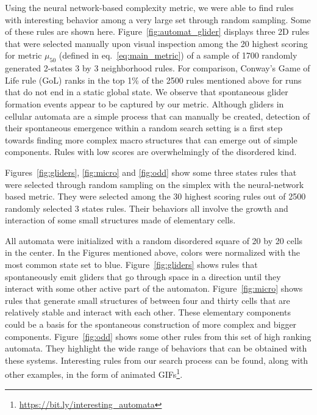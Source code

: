 Using the neural network-based complexity metric, we were able to find rules
with interesting behavior among a very large set through random sampling. Some
of these rules are shown here. Figure~\ref{fig:automat_glider} displays three 2D
rules that were selected manually upon visual inspection among the 20 highest
scoring for metric $\mu_{50}$ (defined in eq.~\eqref{eq:main_metric}) of a sample
of 1700 randomly generated 2-states 3 by 3 neighborhood rules. For comparison,
Conway's Game of Life rule (GoL) ranks in the top 1\% of the 2500 rules
mentioned above for runs that do not end in a static global state. We observe
that spontaneous glider formation events appear to be captured by our metric.
Although gliders in cellular automata are a simple process that can manually be
created, detection of their spontaneous emergence within a random search setting
is a first step towards finding more complex macro structures that can emerge
out of simple components. Rules with low scores are overwhelmingly of the
disordered kind.

Figures~\ref{fig:gliders}, \ref{fig:micro} and \ref{fig:odd} show some three
states rules that were selected through random sampling on the simplex with the
neural-network based metric. They were selected among the 30 highest scoring
rules out of 2500 randomly selected 3 states rules. Their behaviors all involve
the growth and interaction of some small structures made of elementary cells.

All automata were initialized with a random disordered square of 20 by 20 cells
in the center. In the Figures mentioned above, colors were normalized with the
most common state set to blue. Figure~\ref{fig:gliders} shows rules that
spontaneously emit gliders that go through space in a direction until they
interact with some other active part of the automaton. Figure~\ref{fig:micro}
shows rules that generate small structures of between four and thirty cells that
are relatively stable and interact with each other. These elementary components
could be a basis for the spontaneous construction of more complex and bigger
components. Figure~\ref{fig:odd} shows some other rules from this set of high
ranking automata. They highlight the wide range of behaviors that can be
obtained with these systems. Interesting rules from our search process can be
found, along with other examples, in the form of animated
GIFs\footnote{\url{https://bit.ly/interesting_automata}}.

